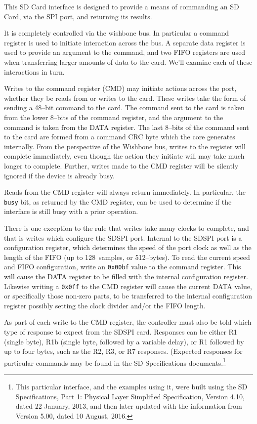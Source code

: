 \documentclass{gqtekspec}
\begin{document}
This SD Card interface is designed to provide a means of commanding an SD Card,
via the SPI port, and returning its results.  

It is completely controlled via the wishbone bus.  In
particular a command register is used to initiate interaction across the bus.
A separate data register is used to provide an argument to the command, and
two FIFO registers are used when transferring larger amounts of data to the
card.  We'll examine each of these interactions in turn.

Writes to the command register (CMD) may initiate actions across the port,
whether they be reads from or writes to the card.  These writes take the
form of sending a 48--bit command to the card.  The command sent to the card
is taken from the lower 8--bits of the command register, and the argument to the
command is taken from the DATA register.  The last 8--bits of the command sent
to the card are formed from a command CRC byte which the core generates
internally.  From the perspective of the Wishbone bus, writes to the register
will complete immediately, even though the action they initiate will may take
much longer to complete.  Further, writes made to the CMD register will be
silently ignored if the device is already busy.

Reads from the CMD register will always return immediately.  In particular, the
{\tt busy} bit, as returned by the CMD register, can be used to determine if the
interface is still busy with a prior operation.

There is one exception to the rule that writes take many clocks to complete,
and that is writes which configure the SDSPI port.  Internal to the SDSPI
port is a configuration register, which determines the speed of the port
clock as well as the length of the FIFO (up to 128~samples, or 512--bytes).
To read the current speed and FIFO configuration, write an {\tt 0x00bf} value to
the command register.  This will cause the DATA register to be filled with
the internal configuration register.  Likewise writing a {\tt 0x0ff} to the
CMD register will cause the current DATA value, or specifically those non-zero
parts, to be transferred to the internal configuration register possibly setting
the clock divider and/or the FIFO length.

As part of each write to the CMD register, the controller must also be told
which type of response to expect from the SDSPI card.  Responses can be either
R1 (single byte), R1b (single byte, followed by a variable delay), or R1
followed by up to four bytes, such as the R2, R3, or R7 responses.
(Expected responses for particular commands may be found in the SD
Specifications documents.\footnote{This particular interface, and the examples
using it, were built using the SD Specifications, Part 1: Physical Layer
Simplified Specification, Version 4.10, dated 22 January, 2013, and then later
updated with the information from Version 5.00, dated 10 August, 2016.}
\end{document}
